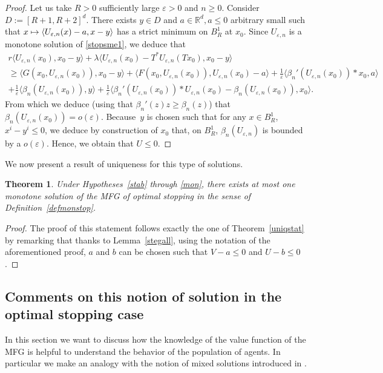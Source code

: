 \documentclass[JEP,XML,SOM,Unicode,NoEqCountersInSection,published]{cedram}
\newcommand\mto{\mathchoice{\longmapsto}{\mapsto}{\mapsto}{\mapsto}}
\let\epsilon\varepsilon
\newtheorem{Theorem}{Theorem}[section]
\theoremstyle{definition}
\begin{document}
\begin{proof}
Let us take $R > 0$ sufficiently large $\epsilon > 0$ and $n \geq 0$. Consider $D:= [R+1,R+2]^d$. There exists $y \in D$ and $a \in \mathbb{R}^d, a \leq 0$ arbitrary small such that $x \mto \langle U_{\epsilon,n}(x) -a, x -y\rangle$ has a strict minimum on $B^1_R$ at $x_0$. Since $U_{\epsilon,n}$ is a monotone solution of \eqref{stopsme1}, we deduce that
\begin{multline*}
r\langle U_{\epsilon,n}(x_0),x_0-y\rangle+\lambda \langle U_{\epsilon,n}(x_0)-T^*U_{\epsilon,n}(Tx_0),x_0 -y\rangle \\
\geq
\langle G(x_0,U_{\epsilon,n}(x_0)),x_0-y\rangle+\langle F(x_0,U_{\epsilon,n}(x_0)), U_{\epsilon,n}(x_0) -a\rangle +\frac{1}{\epsilon} \langle \beta_n'(U_{\epsilon,n}(x_0))*x_0, a\rangle\\
+\frac{1}{\epsilon} \langle \beta_n(U_{\epsilon,n}(x_0)), y\rangle+\frac{1}{\epsilon}\langle \beta_n'(U_{\epsilon,n}(x_0))*U_{\epsilon,n}(x_0)-\beta_n(U_{\epsilon,n}(x_0)),x_0\rangle.
\end{multline*}
From which we deduce (using that $\beta_n'(z)z \geq \beta_n(z)$) that $\beta_n(U_{\epsilon,n}(x_0)) = o(\epsilon)$. Because~$y$ is chosen such that for any $x \in B^1_R$, $x^i-y^i \leq 0$, we deduce by construction of $x_0$ that, on $B^1_R$, $\beta_n(U_{\epsilon,n})$ is bounded by a $o(\epsilon)$. Hence, we obtain that $U \leq 0$.
\end{proof}
We now present a result of uniqueness for this type of solutions.
\begin{Theorem}
Under Hypotheses~\ref{stab} through \ref{mon}, there exists at most one monotone solution of the MFG of optimal stopping in the sense of Definition~\ref{defmonstop}.
\end{Theorem}
\begin{proof}
The proof of this statement follows exactly the one of Theorem~\ref{uniqstat} by remarking that thanks to Lemma~\ref{stegall}, using the notation of the aforementioned proof, $a$ and $b$ can be chosen such that $V-a \leq 0$ and $U-b \leq 0$.
\end{proof}

\subsection{Comments on this notion of solution in the optimal stopping case}
In this section we want to discuss how the knowledge of the value function of the MFG is helpful to understand the behavior of the population of agents. In particular we make an analogy with the notion of mixed solutions introduced in \cite{bertucci2018optimal}.
\end{document}
